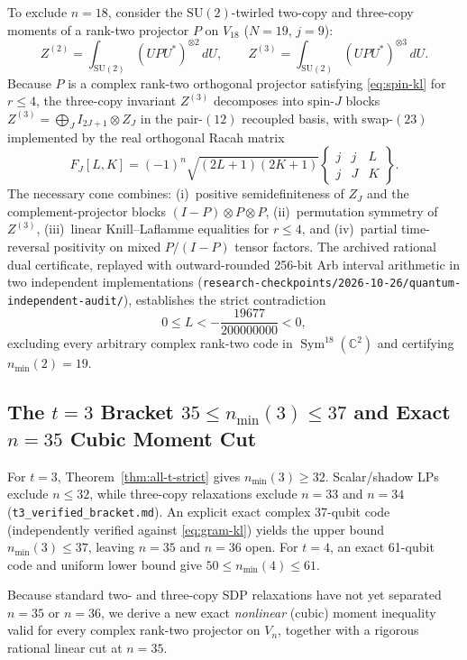 \documentclass[11pt,letterpaper]{article}
\theoremstyle{definition}
\theoremstyle{remark}
\newcommand{\Sym}{\operatorname{Sym}}
\newcommand{\SU}{\mathrm{SU}}
\newcommand{\C}{\mathbb{C}}
\begin{document}
To exclude $n=18$, consider the $\SU(2)$-twirled two-copy and three-copy moments of a rank-two projector $P$ on $V_{18}$ ($N=19$, $j=9$):
\begin{equation}\label{eq:twirl}
  Z^{(2)} = \int_{\SU(2)} (U P U^*)^{\otimes 2}\,dU, \qquad
  Z^{(3)} = \int_{\SU(2)} (U P U^*)^{\otimes 3}\,dU.
\end{equation}
Because $P$ is a complex rank-two orthogonal projector satisfying \eqref{eq:spin-kl} for $r \le 4$, the three-copy invariant $Z^{(3)}$ decomposes into spin-$J$ blocks $Z^{(3)} = \bigoplus_J I_{2J+1} \otimes Z_J$ in the pair-$(12)$ recoupled basis, with swap-$(23)$ implemented by the real orthogonal Racah matrix
\[
  F_J[L,K] = (-1)^n \sqrt{(2L+1)(2K+1)}\begin{Bmatrix} j & j & L \\ j & J & K \end{Bmatrix}.
\]
The necessary cone combines: (i)~positive semidefiniteness of $Z_J$ and the complement-projector blocks $(I-P)\otimes P \otimes P$, (ii)~permutation symmetry of $Z^{(3)}$, (iii)~linear Knill--Laflamme equalities for $r \le 4$, and (iv)~partial time-reversal positivity on mixed $P / (I-P)$ tensor factors. The archived rational dual certificate, replayed with outward-rounded 256-bit Arb interval arithmetic in two independent implementations (\texttt{research-checkpoints/2026-10-26/quantum-independent-audit/}), establishes the strict contradiction
\begin{equation}\label{eq:n18-cert}
  0 \le L < -\frac{19677}{200000000} < 0,
\end{equation}
excluding every arbitrary complex rank-two code in $\Sym^{18}(\C^2)$ and certifying $n_{\min}(2)=19$.

\subsection{The $t=3$ Bracket $35 \le n_{\min}(3) \le 37$ and Exact $n=35$ Cubic Moment Cut}
For $t=3$, Theorem~\ref{thm:all-t-strict} gives $n_{\min}(3) \ge 32$. Scalar/shadow LPs exclude $n \le 32$, while three-copy relaxations exclude $n=33$ and $n=34$ (\texttt{t3\_verified\_bracket.md}). An explicit exact complex 37-qubit code (independently verified against \eqref{eq:gram-kl}) yields the upper bound $n_{\min}(3) \le 37$, leaving $n=35$ and $n=36$ open. For $t=4$, an exact 61-qubit code and uniform lower bound give $50 \le n_{\min}(4) \le 61$.

Because standard two- and three-copy SDP relaxations have not yet separated $n=35$ or $n=36$, we derive a new exact \emph{nonlinear} (cubic) moment inequality valid for every complex rank-two projector on $V_n$, together with a rigorous rational linear cut at $n=35$.
\end{document}
